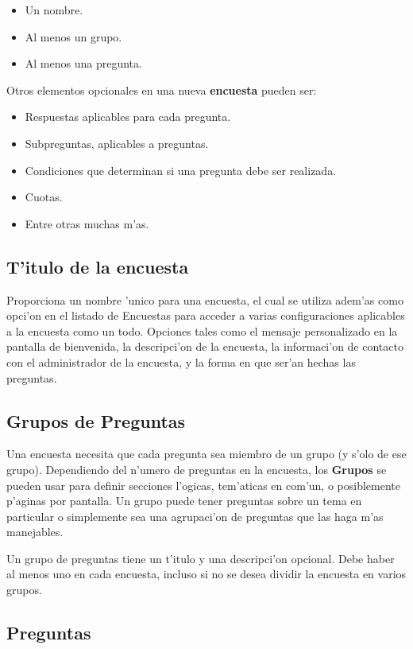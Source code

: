 \documentclass[12pt,spanish]{report}
\begin{document}
\begin{itemize}
\item Un nombre.
\item Al menos un grupo.
\item Al menos una pregunta.
\end{itemize}

Otros elementos opcionales en una nueva {\bf encuesta}  pueden ser:
\begin{itemize}
\item Respuestas aplicables para cada pregunta.
\item Subpreguntas, aplicables a preguntas.
\item Condiciones que determinan si una pregunta debe ser realizada.
\item Cuotas.
\item Entre otras muchas m'as.
\end{itemize}


\subsection{T'itulo de la encuesta}
\label{'titulo_encuesta'}

Proporciona un nombre 'unico para una encuesta, el cual se utiliza adem'as como opci'on en el listado de Encuestas para acceder a varias configuraciones aplicables a la encuesta como un todo. Opciones tales como el mensaje personalizado en la pantalla de bienvenida, la descripci'on de la encuesta, la informaci'on de contacto con el administrador de la encuesta, y la forma en que ser'an hechas las preguntas.

\subsection{Grupos de Preguntas}
\label{'grupo_preguntas'}

Una encuesta necesita que cada pregunta sea miembro de un grupo (y s'olo de ese grupo). Dependiendo del n'umero de preguntas en la encuesta, los {\bf Grupos} se pueden usar para definir secciones l'ogicas, tem'aticas en com'un, o posiblemente p'aginas por pantalla. Un grupo puede tener preguntas sobre un tema en particular o simplemente sea una agrupaci'on de preguntas que las haga m'as manejables.

Un grupo de preguntas tiene un t'itulo y una descripci'on opcional. Debe haber al menos uno en cada encuesta, incluso si no se desea dividir la encuesta en varios grupos.

\subsection{Preguntas}
\label{'preguntas'}
\end{document}
